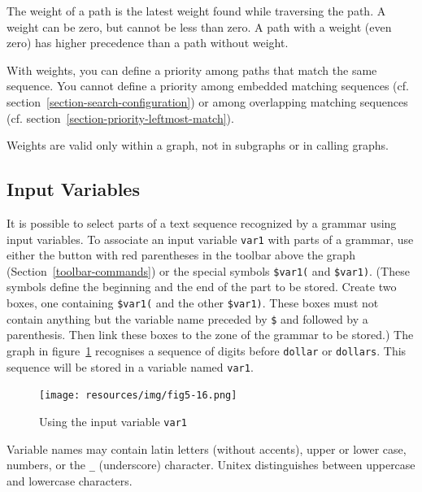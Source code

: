 \bigskip
\noindent The weight of a path is the latest weight found while traversing the path. A weight can be zero, but cannot be less than zero. A path with a weight (even zero) has higher precedence than a path without weight.

\bigskip
\noindent With weights, you can define a priority among paths that match the same sequence.
You cannot define a priority among embedded matching sequences (cf. section~\ref{section-search-configuration})
 or among overlapping matching sequences (cf. section~\ref{section-priority-leftmost-match}).
 
\bigskip
\noindent Weights are valid only within a graph, not in subgraphs or in calling graphs.

\subsection{Input Variables}
\label{section-using-variables}
\index{\verbt{\$}}

It is possible to select parts of a text sequence recognized by a grammar using input
variables. To associate an input variable \verb+var1+ with parts of a grammar, use
either the button with red parentheses in the toolbar above the graph
(Section~\ref{toolbar-commands}) or the special symbols \verb+$var1(+ and \verb+$var1)+.
(These symbols define the beginning and the end of the part to be stored.
Create two boxes, one containing \verb+$var1(+ and the other
\verb+$var1)+. These boxes must not contain anything but the variable name
preceded by \verb+$+ and followed by a parenthesis. Then link these boxes to the
zone of the grammar to be stored.)
The graph in figure~\ref{fig-using-variable} recognises a sequence of digits before
\verb+dollar+ or \verb+dollars+. This sequence will be stored in a variable named
\verb+var1+.

\bigskip
\begin{figure}[!ht]
\begin{center}
\texttt{[image: resources/img/fig5-16.png]}
\caption{Using the input variable
\texttt{var1}\label{fig-using-variable}}
\end{center}
\end{figure}

\noindent Variable names may contain latin letters (without accents), upper or
lower case, numbers, or the \verb+_+ (underscore)
character.\index{\verbc{_}} Unitex distinguishes
between uppercase and lowercase characters.

